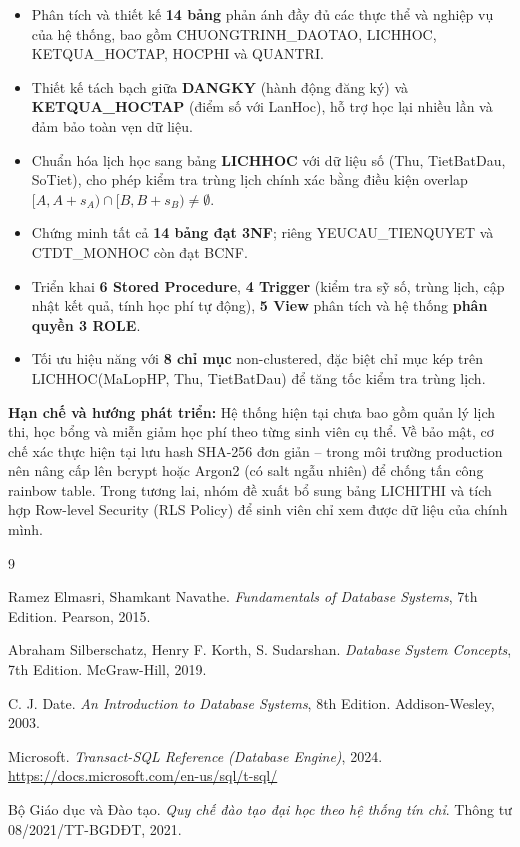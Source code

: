 \documentclass[13pt, a4paper]{article}
\begin{document}
\begin{itemize}[leftmargin=1.5cm]
  \item Phân tích và thiết kế \textbf{14 bảng} phản ánh đầy đủ các thực thể và nghiệp vụ của hệ thống, bao gồm CHUONGTRINH\_DAOTAO, LICHHOC, KETQUA\_HOCTAP, HOCPHI và QUANTRI.
  \item Thiết kế tách bạch giữa \textbf{DANGKY} (hành động đăng ký) và \textbf{KETQUA\_HOCTAP} (điểm số với LanHoc), hỗ trợ học lại nhiều lần và đảm bảo toàn vẹn dữ liệu.
  \item Chuẩn hóa lịch học sang bảng \textbf{LICHHOC} với dữ liệu số (Thu, TietBatDau, SoTiet), cho phép kiểm tra trùng lịch chính xác bằng điều kiện overlap $[A,A+s_A) \cap [B,B+s_B) \neq \emptyset$.
  \item Chứng minh tất cả \textbf{14 bảng đạt 3NF}; riêng YEUCAU\_TIENQUYET và CTDT\_MONHOC còn đạt BCNF.
  \item Triển khai \textbf{6 Stored Procedure}, \textbf{4 Trigger} (kiểm tra sỹ số, trùng lịch, cập nhật kết quả, tính học phí tự động), \textbf{5 View} phân tích và hệ thống \textbf{phân quyền 3 ROLE}.
  \item Tối ưu hiệu năng với \textbf{8 chỉ mục} non-clustered, đặc biệt chỉ mục kép trên LICHHOC(MaLopHP, Thu, TietBatDau) để tăng tốc kiểm tra trùng lịch.
\end{itemize}

\vspace{0.4cm}
\noindent \textbf{Hạn chế và hướng phát triển:} Hệ thống hiện tại chưa bao gồm quản lý lịch thi, học bổng và miễn giảm học phí theo từng sinh viên cụ thể. Về bảo mật, cơ chế xác thực hiện tại lưu hash SHA-256 đơn giản -- trong môi trường production nên nâng cấp lên bcrypt hoặc Argon2 (có salt ngẫu nhiên) để chống tấn công rainbow table. Trong tương lai, nhóm đề xuất bổ sung bảng LICHITHI và tích hợp Row-level Security (RLS Policy) để sinh viên chỉ xem được dữ liệu của chính mình.

\newpage
\begin{thebibliography}{9}

  Ramez Elmasri, Shamkant Navathe.
  \textit{Fundamentals of Database Systems}, 7th Edition.
  Pearson, 2015.

  Abraham Silberschatz, Henry F. Korth, S. Sudarshan.
  \textit{Database System Concepts}, 7th Edition.
  McGraw-Hill, 2019.

  C. J. Date.
  \textit{An Introduction to Database Systems}, 8th Edition.
  Addison-Wesley, 2003.

  Microsoft.
  \textit{Transact-SQL Reference (Database Engine)}, 2024.
  \url{https://docs.microsoft.com/en-us/sql/t-sql/}

  Bộ Giáo dục và Đào tạo.
  \textit{Quy chế đào tạo đại học theo hệ thống tín chỉ}.
  Thông tư 08/2021/TT-BGDĐT, 2021.

\end{thebibliography}
\end{document}
